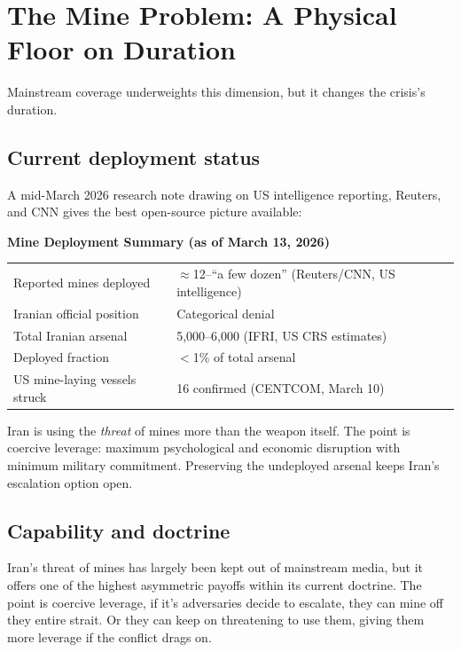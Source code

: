 \documentclass[12pt,a4paper]{article}
\begin{document}
\section{The Mine Problem: A Physical Floor on Duration}

Mainstream coverage underweights this dimension, but it changes the crisis's duration.

\subsection{Current deployment status}

A mid-March 2026 research note drawing on US intelligence reporting, Reuters, and CNN gives the best open-source picture available:

\begin{summarybox}
\textbf{Mine Deployment Summary (as of March 13, 2026)}\\[0.5em]
\begin{tabular}{ll}
  Reported mines deployed & $\approx$12--``a few dozen'' (Reuters/CNN, US intelligence) \\
  Iranian official position & Categorical denial \\
  Total Iranian arsenal & 5,000--6,000 (IFRI, US CRS estimates) \\
  Deployed fraction & $<$1\% of total arsenal \\
  US mine-laying vessels struck & 16 confirmed (CENTCOM, March 10) \\
\end{tabular}
\end{summarybox}

Iran is using the \textit{threat} of mines more than the weapon itself. The point is coercive leverage: maximum psychological and economic disruption with minimum military commitment. Preserving the undeployed arsenal keeps Iran's escalation option open.

\subsection{Capability and doctrine}


Iran's threat of mines has largely been kept out of mainstream media, but it offers one of the highest asymmetric payoffs within its current doctrine. The point is coercive leverage, if it's adversaries decide to escalate, they can mine off they entire strait. Or they can keep on threatening to use them, giving them more leverage if the conflict drags on.
\end{document}
